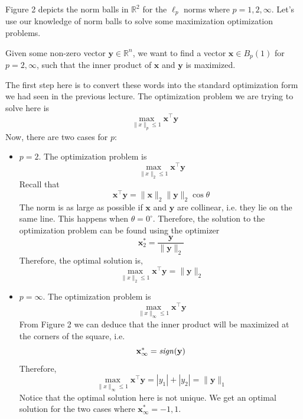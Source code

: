 \documentclass[12pt]{article}
\begin{document}
\noindent Figure 2 depicts the norm balls in $\mathbb{R}^2$ for the $\ell_p$ norms where $p=1,2,\infty$. Let's use our knowledge of norm balls to solve some maximization optimization problems.
\begin{example}
Given some non-zero vector $\mathbf{y}\in\mathbb{R}^n$, we want to find a vector $\mathbf{x}\in B_p(1)$ for $p=2,\infty$, such that the inner product of $\mathbf{x}$ and $\mathbf{y}$ is maximized. 

\noindent The first step here is to convert these words into the standard optimization form we had seen in the previous lecture. The optimization problem we are trying to solve here is
$$\max_{\|x\|_p\leqslant 1} \mathbf{x}^\top\mathbf{y}$$
Now, there are two cases for $p$:
\begin{itemize}
\item $p=2$. The optimization problem is $$\max_{\|x\|_2\leqslant 1} \mathbf{x}^\top\mathbf{y}$$ Recall that $$\mathbf{x}^\top\mathbf{y} = \|\mathbf{x}\|_2\|\mathbf{y}\|_2\cos\theta$$ The norm is as large as possible if $\mathbf{x}$ and $\mathbf{y}$ are collinear, i.e. they lie on the same line. This happens when $\theta=0^\circ$. Therefore, the solution to the optimization problem can be found using the optimizer $$\mathbf{x}_2^* = \frac{\mathbf{y}}{\|\mathbf{y}\|_2}$$ Therefore, the optimal solution is, $$\max_{\|x\|_2\leqslant 1} \mathbf{x}^\top\mathbf{y}=\|\mathbf{y}\|_2$$
\item $p=\infty$. The optimization problem is $$\max_{\|x\|_\infty\leqslant 1} \mathbf{x}^\top\mathbf{y}$$ From Figure 2 we can deduce that the inner product will be maximized at the corners of the square, i.e. $$\mathbf{x}_\infty^* = \mathit{sign}(\mathbf{y})$$ Therefore, $$\max_{\|x\|_\infty\leqslant 1} \mathbf{x}^\top\mathbf{y} = |y_1| + |y_2| = \|\mathbf{y}\|_1$$ Notice that the optimal solution here is not unique. We get an optimal solution for the two cases where $\mathbf{x}_\infty^* = -1,1$.
\end{itemize}
\end{example}
\end{document}
